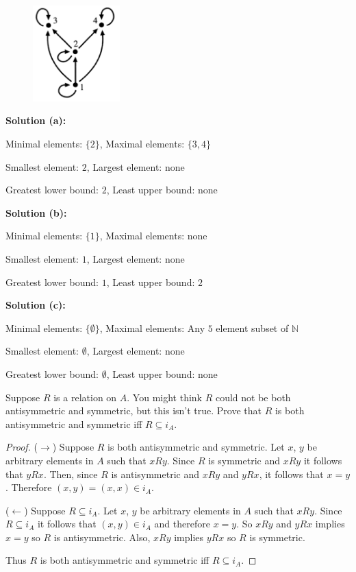 \begin{figure}[h] 
\centering
\includegraphics[width=0.3\textwidth]{images/4.4_2.png} 
\end{figure}

\textbf{Solution (a):}

Minimal elements: $\{2\}$, Maximal elements: $\{3, 4\}$

Smallest element: $2$, Largest element: none

Greatest lower bound: $2$, Least upper bound: none

\textbf{Solution (b):}

Minimal elements: $\{1\}$, Maximal elements: none

Smallest element: $1$, Largest element: none

Greatest lower bound: $1$, Least upper bound: $2$

\textbf{Solution (c):}

Minimal elements: $\{\emptyset\}$, Maximal elements: Any $5$ element subset of $\mathbb{N}$

Smallest element: $\emptyset$, Largest element: none

Greatest lower bound: $\emptyset$, Least upper bound: none

\begin{tcolorbox}[title=Problem 4, breakable]
    Suppose $R$ is a relation on $A$. You might think $R$ could not be both 
    antisymmetric and symmetric, but this isn't true. Prove that $R$ is both 
    antisymmetric and symmetric iff $R \subseteq i_A$.
\end{tcolorbox}

\begin{proof}
    ($\rightarrow$) Suppose $R$ is both antisymmetric and symmetric.
    Let $x$, $y$ be arbitrary elements in $A$ such that $xRy$.
    Since $R$ is symmetric and $xRy$ it follows that $yRx$.
    Then, since $R$ is antisymmetric and $xRy$ and $yRx$, it follows that $x = y$.
    Therefore $(x, y) = (x, x) \in i_A$.

    ($\leftarrow$) Suppose $R \subseteq i_A$.
    Let $x$, $y$ be arbitrary elements in $A$ such that $xRy$.
    Since $R \subseteq i_A$ it follows that $(x, y) \in i_A$ and therefore $x = y$.
    So $xRy$ and $yRx$ implies $x = y$ so $R$ is antisymmetric.
    Also, $xRy$ implies $yRx$ so $R$ is symmetric.

    Thus $R$ is both antisymmetric and symmetric iff $R \subseteq i_A$.
\end{proof}

